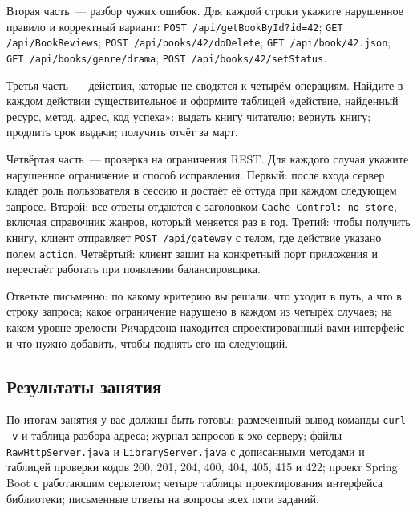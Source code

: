 Вторая часть~--- разбор чужих ошибок. Для каждой строки укажите нарушенное
правило и корректный вариант: \texttt{POST /api/getBookById?id=42};
\texttt{GET /api/BookReviews}; \texttt{POST /api/books/42/doDelete};
\texttt{GET /api/book/42.json}; \texttt{GET /api/books/genre/drama};
\texttt{POST /api/books/42/setStatus}.

Третья часть~--- действия, которые не сводятся к четырём операциям. Найдите в
каждом действии существительное и оформите таблицей «действие, найденный
ресурс, метод, адрес, код успеха»: выдать книгу читателю; вернуть книгу;
продлить срок выдачи; получить отчёт за март.

Четвёртая часть~--- проверка на ограничения REST. Для каждого случая укажите
нарушенное ограничение и способ исправления. Первый: после входа сервер кладёт
роль пользователя в сессию и достаёт её оттуда при каждом следующем запросе.
Второй: все ответы отдаются с заголовком \texttt{Cache-Control: no-store},
включая справочник жанров, который меняется раз в год. Третий: чтобы получить
книгу, клиент отправляет \texttt{POST /api/gateway} с телом, где действие
указано полем \texttt{action}. Четвёртый: клиент зашит на конкретный порт
приложения и перестаёт работать при появлении балансировщика.

Ответьте письменно: по какому критерию вы решали, что уходит в путь, а что в
строку запроса; какое ограничение нарушено в каждом из четырёх случаев; на
каком уровне зрелости Ричардсона находится спроектированный вами интерфейс и
что нужно добавить, чтобы поднять его на следующий.

\subsection*{Результаты занятия}

По итогам занятия у вас должны быть готовы: размеченный вывод команды
\texttt{curl -v} и таблица разбора адреса; журнал запросов к эхо-серверу;
файлы \texttt{RawHttpServer.java} и \texttt{LibraryServer.java} с дописанными
методами и таблицей проверки кодов 200, 201, 204, 400, 404, 405, 415 и 422;
проект Spring Boot с работающим сервлетом; четыре таблицы проектирования
интерфейса библиотеки; письменные ответы на вопросы всех пяти заданий.

\kontrolvoprosy

